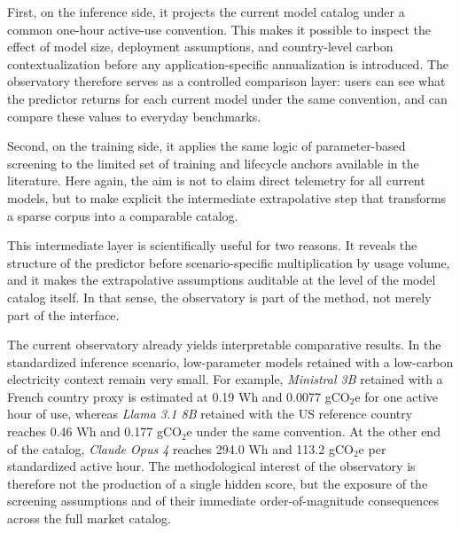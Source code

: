 \documentclass[11pt,a4paper]{article}
\begin{document}
First, on the inference side, it projects the current model catalog under a common one-hour active-use convention. This makes it possible to inspect the effect of model size, deployment assumptions, and country-level carbon contextualization before any application-specific annualization is introduced. The observatory therefore serves as a controlled comparison layer: users can see what the predictor returns for each current model under the same convention, and can compare these values to everyday benchmarks.

Second, on the training side, it applies the same logic of parameter-based screening to the limited set of training and lifecycle anchors available in the literature. Here again, the aim is not to claim direct telemetry for all current models, but to make explicit the intermediate extrapolative step that transforms a sparse corpus into a comparable catalog.

This intermediate layer is scientifically useful for two reasons. It reveals the structure of the predictor before scenario-specific multiplication by usage volume, and it makes the extrapolative assumptions auditable at the level of the model catalog itself. In that sense, the observatory is part of the method, not merely part of the interface.

The current observatory already yields interpretable comparative results. In the standardized inference scenario, low-parameter models retained with a low-carbon electricity context remain very small. For example, \emph{Ministral 3B} retained with a French country proxy is estimated at 0.19 Wh and 0.0077 gCO$_2$e for one active hour of use, whereas \emph{Llama 3.1 8B} retained with the US reference country reaches 0.46 Wh and 0.177 gCO$_2$e under the same convention. At the other end of the catalog, \emph{Claude Opus 4} reaches 294.0 Wh and 113.2 gCO$_2$e per standardized active hour. The methodological interest of the observatory is therefore not the production of a single hidden score, but the exposure of the screening assumptions and of their immediate order-of-magnitude consequences across the full market catalog.
\end{document}
